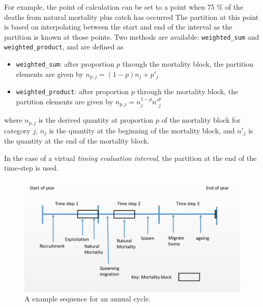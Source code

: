 For example, the point of calculation can be set to a point  when 75 \% of the deaths from natural mortality plus catch has occurred The partition at this point is based on interpolating between the start and end of the interval as the partition is known at those points.  Two  methods are available: \texttt{weighted\_sum} and \texttt{weighted\_product}, and are defined as

\begin{itemize}
	\item \texttt{weighted\_sum}: after proportion $p$ through the mortality block, the partition elements are given by $n_{p,j} = (1 - p)n_j + p'_j$

	\item \texttt{weighted\_product}: after proportion $p$ through the mortality block, the partition elements are given by $n_{p,j} = n_j^{1-p} n'^p_j$
\end{itemize}

where $n_{p,j}$ is the derived quantity at proportion $p$ of the mortality block for category $j$, $n_j$ is the quantity at the beginning of the mortality block, and $n'_j$ is the quantity at the end of the mortality block.

In the case of a virtual \textit{timing evaluation interval}, the partition at the end of the time-step is used.


\begin{figure}[H]
	\centering
	\includegraphics[scale=0.5]{Figures/annual_cycle.jpg}
	\caption{A example sequence for an annual cycle.}\label{Fig:annual2}
\end{figure}



